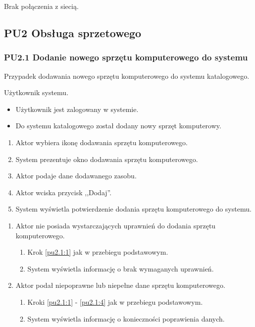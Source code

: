 Brak połączenia z siecią.



\subsection{PU2 Obsługa sprzetowego}

\subsubsection{PU2.1 Dodanie nowego sprzętu komputerowego do systemu}

Przypadek dodawania nowego sprzętu komputerowego do systemu katalogowego.

Użytkownik systemu.

\begin{itemize}
\item Użytkownik jest zalogowany w systemie.
\end{itemize}

\begin{itemize}
\item Do systemu katalogowego został dodany nowy sprzęt komputerowy.
\end{itemize}

\begin{enumerate}
\item \label{pu2.1:1} Aktor wybiera ikonę dodawania sprzętu komputerowego.
\item System prezentuje okno dodawania sprzętu komputerowego.
\item Aktor podaje dane dodawanego zasobu.
\item \label{pu2.1:4} Aktor wciska przycisk ,,Dodaj''.
\item System wyświetla potwierdzenie dodania sprzętu komputerowego do systemu.
\end{enumerate}

\begin{enumerate}
\item Aktor nie posiada wystarczających uprawnień do dodania sprzętu komputerowego.
	\begin{enumerate}[label*=\arabic*.]
		\item Krok \ref{pu2.1:1} jak w przebiegu podstawowym.
		\item System wyświetla informację o brak wymaganych uprawnień.
	\end{enumerate}
\item Aktor podał niepoprawne lub niepełne dane sprzętu komputerowego.
	\begin{enumerate}[label*=\arabic*.]
		\item Kroki \ref{pu2.1:1} - \ref{pu2.1:4} jak w przebiegu podstawowym.
		\item System wyświetla informację o konieczności poprawienia danych.
	\end{enumerate}
\end{enumerate}

